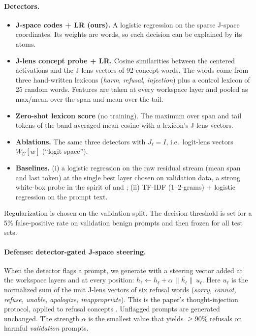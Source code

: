 \paragraph{Detectors.}
\begin{itemize}
  \item \textbf{J-space codes + LR (ours).} A logistic regression on the sparse J-space
        coordinates. Its weights are words, so each decision can be explained by its atoms.
  \item \textbf{J-lens concept probe + LR.} Cosine similarities between the centered
        activations and the J-lens vectors of 92 concept words. The words come from three
        hand-written lexicons (\emph{harm}, \emph{refusal}, \emph{injection}) plus a control
        lexicon of 25 random words. Features are taken at every workspace layer and pooled
        as max/mean over the span and mean over the tail.
  \item \textbf{Zero-shot lexicon score} (no training). The maximum over span and tail
        tokens of the band-averaged mean cosine with a lexicon's J-lens vectors.
  \item \textbf{Ablations.} The same three detectors with $J_\ell=I$, i.e.\ logit-lens
        vectors $W_U[w]$ (``logit space'').
  \item \textbf{Baselines.} (i) a logistic regression on the raw residual stream (mean span
        and last token) at the single best layer chosen on validation data, a strong
        white-box probe in the spirit of \citet{arditi2024refusal} and
        \citet{abdelnabi2024drift}; (ii) TF-IDF (1--2-grams) + logistic regression on the
        prompt text.
\end{itemize}
Regularization is chosen on the validation split. The decision threshold is set for a 5\%
false-positive rate on validation benign prompts and then frozen for all test sets.

\paragraph{Defense: detector-gated J-space steering.} When the detector flags a prompt, we
generate with a steering vector added at the workspace layers and at every position:
$h_\ell \leftarrow h_\ell + \alpha\,\overline{\|h_\ell\|}\,u_\ell$. Here $u_\ell$ is the
normalized sum of the unit J-lens vectors of six refusal words (\textit{sorry, cannot,
refuse, unable, apologize, inappropriate}). This is the paper's thought-injection protocol,
applied to refusal concepts \citep{gurnee2026workspace,turner2023steering}. Unflagged prompts
are generated unchanged. The strength $\alpha$ is the smallest value that yields $\ge 90\%$
refusals on harmful \emph{validation} prompts.

